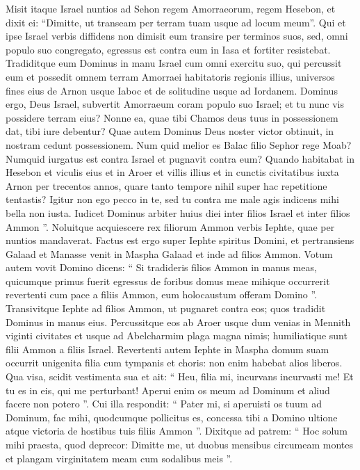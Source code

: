 \begin{biblechapter}
\begin{biblechapter}
\begin{biblechapter}
\begin{biblechapter}
\begin{biblechapter}
\begin{biblechapter}
\begin{biblechapter}
\begin{biblechapter}
\begin{biblechapter}
\begin{biblechapter}
\begin{biblechapter}
\verse Misit itaque Israel nuntios ad Sehon regem Amorraeorum, regem Hesebon, et dixit ei: “Dimitte, ut transeam per terram tuam usque ad locum meum”. 
\verse Qui et ipse Israel verbis diffidens non dimisit eum transire per terminos suos, sed, omni populo suo congregato, egressus est contra eum in Iasa et fortiter resistebat. 
 \verse Tradiditque eum Dominus in manu Israel cum omni exercitu suo, qui percussit eum et possedit omnem terram Amorraei habitatoris regionis illius, 
\verse universos fines eius de Arnon usque Iaboc et de solitudine usque ad Iordanem. 
 \verse Dominus ergo, Deus Israel, subvertit Amorraeum coram populo suo Israel; et tu nunc vis possidere terram eius? 
\verse Nonne ea, quae tibi Chamos deus tuus in possessionem dat, tibi iure debentur? Quae autem Dominus Deus noster victor obtinuit, in nostram cedunt possessionem. 
\verse Num quid melior es Balac filio Sephor rege Moab? Numquid iurgatus est contra Israel et pugnavit contra eum? 
 \verse Quando habitabat in Hesebon et viculis eius et in Aroer et villis illius et in cunctis civitatibus iuxta Arnon per trecentos annos, quare tanto tempore nihil super hac repetitione tentastis? 
\verse Igitur non ego pecco in te, sed tu contra me male agis indicens mihi bella non iusta. Iudicet Dominus arbiter huius diei inter filios Israel et inter filios Ammon ”. 
\verse Noluitque acquiescere rex filiorum Ammon verbis Iephte, quae per nuntios mandaverat.
 \verse Factus est ergo super Iephte spiritus Domini, et pertransiens Galaad et Manasse venit in Maspha Galaad et inde ad filios Ammon. 
\verse Votum autem vovit Domino dicens: “ Si tradideris filios Ammon in manus meas, 
\verse quicumque primus fuerit egressus de foribus domus meae mihique occurrerit revertenti cum pace a filiis Ammon, eum holocaustum offeram Domino ”. 
\verse Transivitque Iephte ad filios Ammon, ut pugnaret contra eos; quos tradidit Dominus in manus eius. 
\verse Percussitque eos ab Aroer usque dum venias in Mennith viginti civitates et usque ad Abelcharmim plaga magna nimis; humiliatique sunt filii Ammon a filiis Israel.
 \verse Revertenti autem Iephte in Maspha domum suam occurrit unigenita filia cum tympanis et choris: non enim habebat alios liberos. 
\verse Qua visa, scidit vestimenta sua et ait: “ Heu, filia mi, incurvans incurvasti me! Et tu es in eis, qui me perturbant! Aperui enim os meum ad Dominum et aliud facere non potero ”. 
\verse Cui illa respondit: “ Pater mi, si aperuisti os tuum ad Dominum, fac mihi, quodcumque pollicitus es, concessa tibi a Domino ultione atque victoria de hostibus tuis filiis Ammon ”. 
\verse Dixitque ad patrem: “ Hoc solum mihi praesta, quod deprecor: Dimitte me, ut duobus mensibus circumeam montes et plangam virginitatem meam cum sodalibus meis ”. 

\end{biblechapter}
\end{biblechapter}
\end{biblechapter}
\end{biblechapter}
\end{biblechapter}
\end{biblechapter}
\end{biblechapter}
\end{biblechapter}
\end{biblechapter}
\end{biblechapter}
\end{biblechapter}
